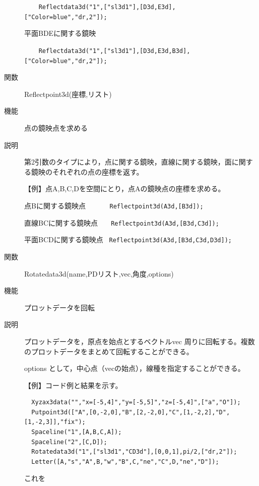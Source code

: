 \documentclass[papersize,a4paper,12pt,uplatex]{jsarticle}
\begin{document}
\begin{description}
 \verb|    Reflectdata3d("1",["sl3d1"],[D3d,E3d],["Color=blue","dr,2"]);|

\hspace{20mm} 

平面BDEに関する鏡映

\verb|    Reflectdata3d("1",["sl3d1"],[D3d,E3d,B3d],["Color=blue","dr,2"]);|

\hspace{20mm} 
 

\vspace{\baselineskip}
\hypertarget{reflectpoint3d}{}
\item[関数]  Reflectpoint3d(座標,リスト)
\item[機能]  点の鏡映点を求める
\item[説明]  第2引数のタイプにより，点に関する鏡映，直線に関する鏡映，面に関する鏡映のそれぞれの点の座標を返す。

\vspace{\baselineskip}
【例】点A,B,C,Dを空間にとり，点Aの鏡映点の座標を求める。

点Bに関する鏡映点      \verb|      Reflectpoint3d(A3d,[B3d]);|
    
直線BCに関する鏡映点  \verb|   Reflectpoint3d(A3d,[B3d,C3d]);|
    
平面BCDに関する鏡映点  \verb| Reflectpoint3d(A3d,[B3d,C3d,D3d]);|
 
    
\vspace{\baselineskip}
\hypertarget{rotatedata3d}{}
\item[関数]  Rotatedata3d(name,PDリスト,vec,角度,options)
\item[機能]  プロットデータを回転
\item[説明]  プロットデータを，原点を始点とするベクトルvec 周りに回転する。複数のプロットデータをまとめて回転することができる。

options として，中心点（vecの始点），線種を指定することができる。

\vspace{\baselineskip}
【例】コード例と結果を示す。
\begin{verbatim}
  Xyzax3data("","x=[-5,4]","y=[-5,5]","z=[-5,4]",["a","O"]);
  Putpoint3d(["A",[0,-2,0],"B",[2,-2,0],"C",[1,-2,2],"D",[1,-2,3]],"fix");
  Spaceline("1",[A,B,C,A]);
  Spaceline("2",[C,D]);
  Rotatedata3d("1",["sl3d1","CD3d"],[0,0,1],pi/2,["dr,2"]);
  Letter([A,"s","A",B,"w","B",C,"ne","C",D,"ne","D"]);
\end{verbatim}
これを


\end{description}
\end{document}
